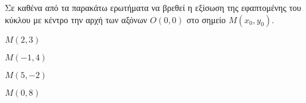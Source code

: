 Σε καθένα από τα παρακάτω ερωτήματα να βρεθεί η εξίσωση της εφαπτομένης του κύκλου με κέντρο την αρχή των αξόνων $ O(0,0) $ στο σημείο $ M(x_0,y_0) $.
\begin{multicols}{2}
\begin{alist}
\item $ M(2,3) $
\item $ M(-1,4) $
\item $ M(5,-2) $
\item $ M(0,8) $
\end{alist}
\end{multicols}
